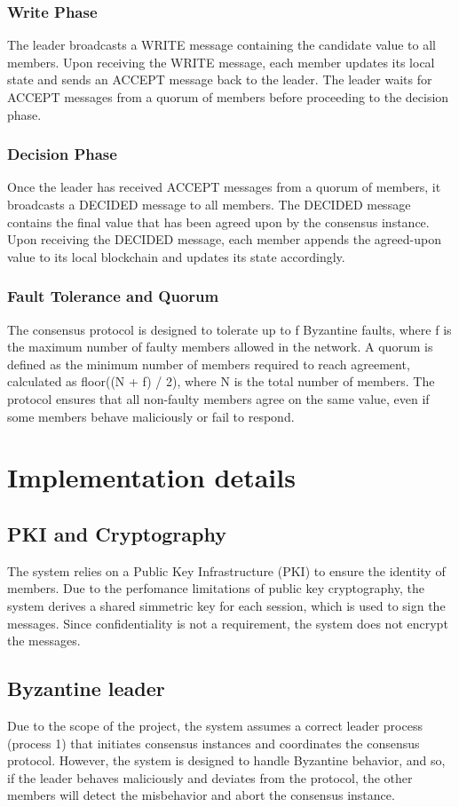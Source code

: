 \documentclass[runningheads]{llncs}
\begin{document}
\subsubsection{Write Phase}
The leader broadcasts a WRITE message containing the candidate value to all
members. Upon receiving the WRITE message, each member updates its local state
and sends an ACCEPT message back to the leader. The leader waits for ACCEPT
messages from a quorum of members before proceeding to the decision phase.
\subsubsection{Decision Phase}
Once the leader has received ACCEPT messages from a quorum of members, it
broadcasts a DECIDED message to all members. The DECIDED message contains the
final value that has been agreed upon by the consensus instance. Upon receiving
the DECIDED message, each member appends the agreed-upon value to its local
blockchain and updates its state accordingly.
\subsubsection{Fault Tolerance and Quorum}
The consensus protocol is designed to tolerate up to f Byzantine faults, where f
is the maximum number of faulty members allowed in the network. A quorum is
defined as the minimum number of members required to reach agreement, calculated
as floor((N + f) / 2), where N is the total number of members. The protocol
ensures that all non-faulty members agree on the same value, even if some
members behave maliciously or fail to respond.

%
\section{Implementation details}
\subsection{PKI and Cryptography}
The system relies on a Public Key Infrastructure (PKI) to ensure the identity of
members. Due to the perfomance limitations of public key cryptography, the
system derives a shared simmetric key for each session, which is used to sign
the messages. Since confidentiality is not a requirement, the system does not
encrypt the messages.
%
\subsection{Byzantine leader}
Due to the scope of the project, the system assumes a correct leader process
(process 1) that initiates consensus instances and coordinates the consensus
protocol. However, the system is designed to handle Byzantine behavior, and so,
if the leader behaves maliciously and deviates from the protocol, the other
members will detect the misbehavior and abort the consensus instance.
%
\end{document}
